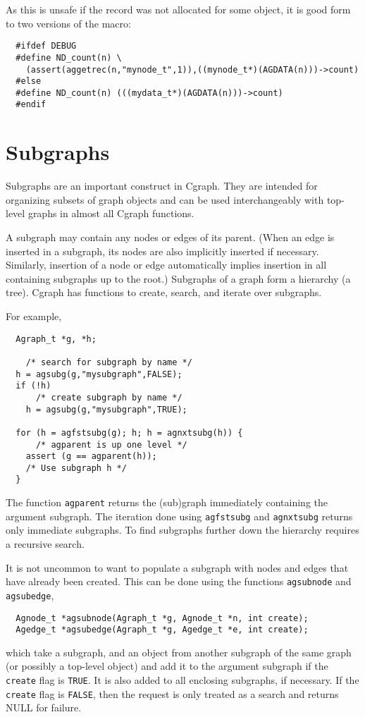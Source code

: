 \documentclass[11pt,letterpaper]{article}
\begin{document}
As this is unsafe if the record was not allocated for some object, it is good form
to two versions of the macro:
\begin{verbatim}
  #ifdef DEBUG
  #define ND_count(n) \
    (assert(aggetrec(n,"mynode_t",1)),((mynode_t*)(AGDATA(n)))->count)
  #else
  #define ND_count(n) (((mydata_t*)(AGDATA(n)))->count)
  #endif
\end{verbatim}

\section{Subgraphs}
\label{sec:subgraphs}
Subgraphs are an important construct in Cgraph.  They are intended for
organizing subsets of graph objects and can be used interchangeably with
top-level graphs in almost all Cgraph functions.

A subgraph may contain any nodes or edges of its parent.
(When an edge is inserted in a subgraph, its nodes
are also implicitly inserted if necessary.  Similarly,
insertion of a node or edge automatically implies
insertion in all containing subgraphs up to the root.)
Subgraphs of a graph form a hierarchy (a tree).
Cgraph has functions to create, search, and iterate over subgraphs.

For example,
\begin{verbatim}
  Agraph_t *g, *h;

    /* search for subgraph by name */
  h = agsubg(g,"mysubgraph",FALSE);  
  if (!h) 
      /* create subgraph by name */
    h = agsubg(g,"mysubgraph",TRUE);   

  for (h = agfstsubg(g); h; h = agnxtsubg(h)) {
      /* agparent is up one level */
    assert (g == agparent(h));     
    /* Use subgraph h */
  }
\end{verbatim}

The function \verb"agparent" returns the (sub)graph immediately containing the
argument subgraph. The iteration done using \verb"agfstsubg" and \verb"agnxtsubg" 
returns only immediate subgraphs. To find subgraphs further down the hierarchy 
requires a recursive search.

It is not uncommon to want to populate a subgraph with nodes and edges that have
already been created. This can be done using
the functions \verb"agsubnode" and \verb"agsubedge", 
\begin{verbatim}
  Agnode_t *agsubnode(Agraph_t *g, Agnode_t *n, int create);
  Agedge_t *agsubedge(Agraph_t *g, Agedge_t *e, int create);
\end{verbatim}
which take a subgraph,
and an object from another subgraph of the same
graph (or possibly a top-level object) and add it to the argument subgraph
if the \verb"create" flag is \verb"TRUE".
It is also added to all enclosing subgraphs, if necessary.
If the \verb"create" flag is \verb"FALSE", then the
request is only treated as a search and returns NULL for failure.
\end{document}
